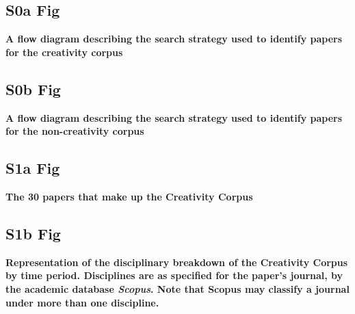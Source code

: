 \documentclass[10pt,letterpaper]{article}
\begin{document}

\subsection*{S0a Fig}\label{S0a_Fig}
{\bf A flow diagram describing the search strategy used to identify papers for the creativity corpus} 

\subsection*{S0b Fig}\label{S0b_Fig}
{\bf A flow diagram describing the search strategy used to identify papers for the non-creativity corpus} 

\subsection*{S1a Fig}\label{S1a_Fig}
{\bf The 30 papers that make up the Creativity Corpus} 


\subsection*{S1b Fig}
\label{S1b_Fig}
{\bf Representation of the disciplinary breakdown of the Creativity Corpus by time period. Disciplines are as specified for the paper's journal, by the academic database {\em Scopus}. Note that Scopus may classify a journal under more than one discipline.} 
\end{document}

